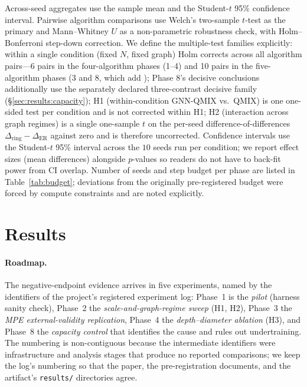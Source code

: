 Across-seed aggregates use the sample mean and the Student-$t$ 95\%
confidence interval. Pairwise algorithm comparisons use Welch's two-sample
$t$-test as the primary and Mann--Whitney $U$ as a non-parametric
robustness check, with Holm--Bonferroni step-down correction. We define
the multiple-test families explicitly: within a single condition
(fixed $N$, fixed graph) Holm corrects across all algorithm pairs---6
pairs in the four-algorithm phases (1--4) and 10 pairs in the
five-algorithm phases (3 and 8, which add \mlpqmix); Phase 8's decisive
conclusions additionally use the separately declared three-contrast
decisive family (\S\ref{sec:results:capacity});
H1 (within-condition GNN-QMIX vs.\ QMIX) is one one-sided test per
condition and is not corrected within H1; H2 (interaction across
graph regimes) is a single one-sample $t$ on the per-seed
difference-of-differences $\Delta_{\text{ring}} - \Delta_{\text{ER}}$
against zero and is therefore uncorrected. Confidence intervals use the
Student-$t$ 95\% interval across the $10$ seeds run per condition; we report
effect sizes (mean differences) alongside $p$-values so readers do not have to
back-fit power from CI overlap. Number of seeds
and step budget per phase are listed in Table~\ref{tab:budget};
deviations from the originally pre-registered budget were forced by
compute constraints and are noted explicitly.

\section{Results}
\label{sec:results}

\paragraph{Roadmap.} The negative-endpoint evidence arrives in five
experiments, named by the identifiers of the project's registered experiment
log: Phase~1 is the \emph{pilot} (harness sanity check), Phase~2 the
\emph{scale-and-graph-regime sweep} (H1, H2), Phase~3 the \emph{MPE
external-validity replication}, Phase~4 the \emph{depth--diameter ablation}
(H3), and Phase~8 the \emph{capacity control} that identifies the cause and
rules out undertraining. The numbering is non-contiguous because the
intermediate identifiers were infrastructure and analysis stages that
produce no reported comparisons; we keep the log's numbering so that the
paper, the pre-registration documents, and the artifact's
\texttt{results/} directories agree.

